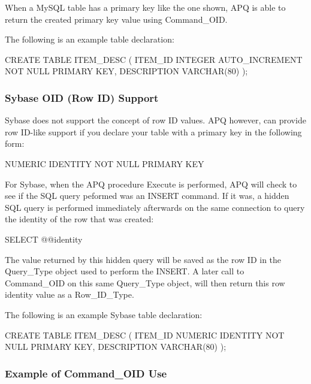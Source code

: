 \documentclass[english,letterpaper]{book}
\begin{document}
When a MySQL table has a primary key like the one shown, APQ is able
to return the created primary key value using Command\_OID. 

The following is an example table declaration:

\begin{SQL}
CREATE TABLE ITEM_DESC (
   ITEM_ID     INTEGER AUTO_INCREMENT NOT NULL PRIMARY KEY,
   DESCRIPTION VARCHAR(80)
);
\end{SQL}

\subsubsection{Sybase OID (Row ID) Support}

Sybase does not support the concept of row ID values. APQ however,
can provide row ID-like support if you declare your table with a primary
key in the following form:

\begin{SQL}

   NUMERIC IDENTITY NOT NULL PRIMARY KEY

\end{SQL}

For Sybase, when the APQ procedure Execute is performed, APQ will
check to see if the SQL query peformed was an INSERT command. If it
was, a hidden SQL query is performed immediately afterwards on the
same connection to query the identity of the row that was created:

\begin{SQL}

   SELECT @@identity

\end{SQL}

The value returned by this hidden query will be saved as the row ID
in the Query\-\_Type object used to perform the INSERT. A later call
to Command\_OID on this same Query\_Type object, will then return
this row identity value as a Row\_ID\_Type.

The following is an example Sybase table declaration:

\begin{SQL}
CREATE TABLE ITEM_DESC (
   ITEM_ID     NUMERIC IDENTITY NOT NULL PRIMARY KEY,
   DESCRIPTION VARCHAR(80)
);
\end{SQL}

\subsubsection{Example of Command\_OID Use}
\end{document}
